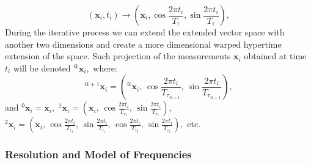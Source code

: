 \begin{equation}
\left(\mathbf{x}_i, t_i\right) \rightarrow \left(\mathbf{x}_i, \cos{\frac{2\pi t_{i}}{T_{\tau}}}, \sin{\frac{2\pi t_{i}}{T_{\tau}}}\right),
\end{equation}
%
During the iterative process we can extend the extended vector space with another two dimensions and create a more dimensional warped hypertime extension of the space. 
Such projection of the measurements $\mathbf{x}_i$ obtained at time $t_i$ will be denoted ${}^{@}\mathbf{x}_{i},$ where:
%
\begin{equation}\label{eqn:extensionWHyTeS}
    {}^{@+1}\mathbf{x}_{i} = \left({}^{@}\mathbf{x}_{i}, \,\cos{\frac{2\pi t_{i}}{T_{\tau_{@+1}}}}, \, \sin{\frac{2\pi t_{i}}{T_{\tau_{@+1}}}}\right),
\end{equation}
%
and ${}^{0}\mathbf{x}_{i} = \mathbf{x}_{i},$ ${}^{1}\mathbf{x}_{i} = \left(\mathbf{x}_{i}, \,\cos{\frac{2\pi t_{i}}{T_{\tau_1}}}, \, \sin{\frac{2\pi t_{i}}{T_{\tau_1}}}\right),$ ${}^{2}\mathbf{x}_{i} = \left(\mathbf{x}_{i}, \,\cos{\frac{2\pi t_{i}}{T_{\tau_1}}}, \, \sin{\frac{2\pi t_{i}}{T_{\tau_1}}}, \,\cos{\frac{2\pi t_{i}}{T_{\tau_2}}}, \, \sin{\frac{2\pi t_{i}}{T_{\tau_2}}}\right),$ etc.



\subsubsection{Resolution and Model of Frequencies}\label{sec:resolution}

